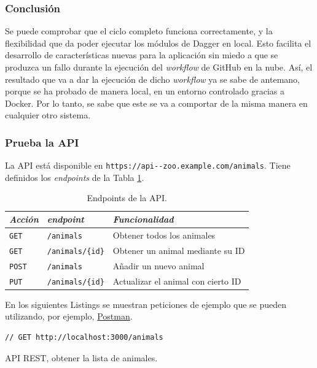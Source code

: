 \subsubsection*{Conclusión}

Se puede comprobar que el ciclo completo funciona correctamente, y la flexibilidad que da poder ejecutar los módulos de Dagger en local. Esto facilita el desarrollo de características nuevas para la aplicación sin miedo a que se produzca un fallo durante la ejecución del \textit{workflow} de GitHub en la nube. Así, el resultado que va a dar la ejecución de dicho \textit{workflow} ya se sabe de antemano, porque se ha probado de manera local, en un entorno controlado gracias a Docker. Por lo tanto, se sabe que este se va a comportar de la misma manera en cualquier otro sistema.

\subsubsection*{Prueba la API}

La API está disponible en \texttt{https://api--zoo.example.com/animals}. Tiene definidos los \textit{endpoints} de la Tabla \ref{tabla:endpoints}.

\begin{table}[h]
  \centering
  \begin{tabular}{|l|l|l|}
    \hline
    \textit{Acción} & \textit{endpoint} & \textit{Funcionalidad} \\ \hline
    \texttt{GET} & \texttt{/animals} & Obtener todos los animales \\ \hline
    \texttt{GET} & \texttt{/animals/\{id\}} & Obtener un animal mediante su ID \\ \hline
    \texttt{POST} & \texttt{/animals} & Añadir un nuevo animal \\ \hline
    \texttt{PUT} & \texttt{/animals/\{id\}} & Actualizar el animal con cierto ID \\ \hline
  \end{tabular}
  \caption{Endpoints de la API.}
  \label{tabla:endpoints}
\end{table}

En los siguientes Listings se muestran peticiones de ejemplo que se pueden utilizando, por ejemplo, \href{https://www.postman.com/}{Postman}.

\begin{listing}[!ht]
  \begin{verbatim}
// GET http://localhost:3000/animals
  \end{verbatim}
  \caption{API REST, obtener la lista de animales.}
\end{listing}

